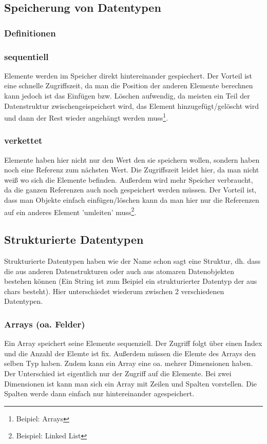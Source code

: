 \documentclass[a4paper]{scrartcl}
\begin{document}
        \subsection{Speicherung von Datentypen}
            \subsubsection{Definitionen}  
            \subsubsection*{sequentiell}
                Elemente werden im Speicher direkt hintereinander gespiechert. Der Vorteil ist eine schnelle Zugriffszeit, da man die Position der anderen Elemente berechnen kann jedoch ist das 
                Einfügen bzw. Löschen aufwendig, da meisten ein Teil der Datenstruktur zwischengeispeichert wird, das Element hinzugefügt/gelöscht wird und dann der Rest wieder angehängt werden muss\footnote{Beipiel: Arrays}.
            \subsubsection*{verkettet}
                Elemente haben hier nicht nur den Wert den sie speichern wollen, sondern haben noch eine Referenz zum nächsten Wert. Die Zugriffszeit leidet hier, da man nicht weiß wo sich die Elemente befinden.
                Außerdem wird mehr Speicher verbraucht, da die ganzen Referenzen auch noch gespeichert werden müssen. Der Vorteil ist, dass man Objekte einfach einfügen/löschen kann da man hier nur die Referenzen
                auf ein anderes Element 'umleiten' muss\footnote{Beispiel: Linked List}.
        \subsection{Strukturierte Datentypen}
                Strukturierte Datentypen haben wie der Name schon sagt eine Struktur, dh. dass die aus anderen Datenstrukturen oder auch aus atomaren Datenobjekten bestehen können (Ein String ist zum Beipiel
                ein strukturierter Datentyp der aus chars besteht). Hier unterschiedet wiederum zwischen 2 verschiedenen Datentypen.
            \subsubsection*{Arrays (oa. Felder)}
                Ein Array speichert seine Elemente sequenziell. Der Zugriff folgt über einen Index und die Anzahl der Elemte ist fix. Außerdem müssen die Elemte des Arrays den selben Typ haben.
                Zudem kann ein Array eine oa. mehrer Dimensionen haben. Der Unterschied ist eigentlich nur der Zugriff auf die Elemente. Bei zwei Dimensionen ist kann man sich ein Array mit Zeilen und Spalten vorstellen.
                Die Spalten werde dann einfach nur hintereinander agespeichert.
\end{document}
